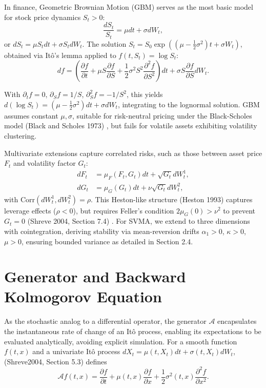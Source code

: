 \documentclass[12pt]{report}
\begin{document}
In finance, Geometric Brownian Motion (GBM) serves as the most basic model for stock price dynamics \(S_t > 0\):
\[
    \frac{dS_t}{S_t} = \mu dt + \sigma dW_t,
\]
or \(dS_t = \mu S_t dt + \sigma S_t dW_t\). The solution \(S_t = S_0 \exp\left( (\mu - \frac{1}{2} \sigma^2) t + \sigma W_t \right)\), obtained via Itô’s lemma applied to \(f(t, S_t) = \log S_t\):
\[
    df = \left( \frac{\partial f}{\partial t} + \mu S \frac{\partial f}{\partial S} + \frac{1}{2} \sigma^2 S^2 \frac{\partial^2 f}{\partial S^2} \right) dt + \sigma S \frac{\partial f}{\partial S} dW_t.
\]

With \(\partial_t f = 0\), \(\partial_S f = 1/S\), \(\partial^2_S f = -1/S^2\), this yields \(d(\log S_t) = (\mu - \frac{1}{2} \sigma^2) dt + \sigma dW_t\), integrating to the lognormal solution. GBM assumes constant \(\mu, \sigma\), suitable for risk-neutral pricing under the Black-Scholes model (Black and Scholes 1973) \cite{black1973pricing}, but fails for volatile assets exhibiting volatility clustering.

\vspace{0.2in}

Multivariate extensions capture correlated risks, such as those between asset price \(F_t\) and volatility factor \(G_t\):
\begin{align}
    dF_t &= \mu_F(F_t, G_t) dt + \sqrt{G_t} dW_t^1, \\[4pt]
    dG_t &= \mu_G(G_t) dt + \nu \sqrt{G_t} dW_t^2,
\end{align}
with \(\text{Corr}(dW_t^1, dW_t^2) = \rho\). This Heston-like structure (Heston 1993) \cite{heston1993closed} captures leverage effects (\(\rho < 0\)), but requires Feller's condition \(2\mu_G(0) > \nu^2\) to prevent \(G_t = 0\) (Shreve 2004, Section 7.4) \cite{shreve2004}. For SVMA, we extend to three dimensions with cointegration, deriving stability via mean-reversion drifts \(\alpha_1 > 0\), \(\kappa > 0\), \(\mu > 0\), ensuring bounded variance as detailed in Section 2.4.

\section{Generator and Backward Kolmogorov Equation}

As the stochastic analog to a differential operator, the generator \(\mathcal{A}\) encapsulates the instantaneous rate of change of an Itô process, enabling its expectations to be evaluated analytically, avoiding explicit simulation. For a smooth function \(f(t, x)\) and a univariate Itô process \(dX_t = \mu(t, X_t)dt + \sigma(t, X_t)dW_t\), (Shreve2004, Section 5.3) \cite{shreve2004} defines
\[
    \mathcal{A}f(t, x) = \frac{\partial f}{\partial t} + \mu(t, x) \frac{\partial f}{\partial x} + \frac{1}{2} \sigma^2(t, x) \frac{\partial^2 f}{\partial x^2}.
\]
\end{document}
